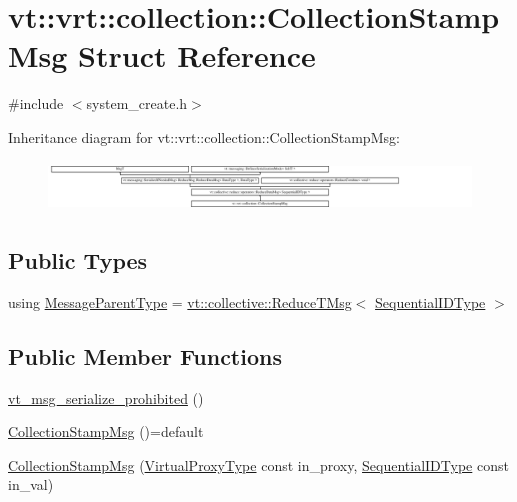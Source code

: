\hypertarget{structvt_1_1vrt_1_1collection_1_1_collection_stamp_msg}{}\section{vt\+:\+:vrt\+:\+:collection\+:\+:Collection\+Stamp\+Msg Struct Reference}
\label{structvt_1_1vrt_1_1collection_1_1_collection_stamp_msg}


{\ttfamily \#include $<$system\+\_\+create.\+h$>$}

Inheritance diagram for vt\+:\+:vrt\+:\+:collection\+:\+:Collection\+Stamp\+Msg\+:\begin{figure}[H]
\begin{center}
\leavevmode
\includegraphics[height=1.335719cm]{structvt_1_1vrt_1_1collection_1_1_collection_stamp_msg}
\end{center}
\end{figure}
\subsection*{Public Types}
\begin{DoxyCompactItemize}
\item 
using \hyperlink{structvt_1_1vrt_1_1collection_1_1_collection_stamp_msg_ac804b80a7abb715cc14b087e8714352a}{Message\+Parent\+Type} = \hyperlink{namespacevt_1_1collective_a28b82d5d48c9bc6e4fd738fcbf9e0f62}{vt\+::collective\+::\+Reduce\+T\+Msg}$<$ \hyperlink{namespacevt_a3063d4db3b879d6dd2c7b8d50995c7f6}{Sequential\+I\+D\+Type} $>$
\end{DoxyCompactItemize}
\subsection*{Public Member Functions}
\begin{DoxyCompactItemize}
\item 
\hyperlink{structvt_1_1vrt_1_1collection_1_1_collection_stamp_msg_a7718d6f0ea3e20cff67e3700149a2d38}{vt\+\_\+msg\+\_\+serialize\+\_\+prohibited} ()
\item 
\hyperlink{structvt_1_1vrt_1_1collection_1_1_collection_stamp_msg_ae285a89b90d6975acfcb20e51c6ad3d0}{Collection\+Stamp\+Msg} ()=default
\item 
\hyperlink{structvt_1_1vrt_1_1collection_1_1_collection_stamp_msg_abc2eccf793579917467c898d4ea02a72}{Collection\+Stamp\+Msg} (\hyperlink{namespacevt_a1b417dd5d684f045bb58a0ede70045ac}{Virtual\+Proxy\+Type} const in\+\_\+proxy, \hyperlink{namespacevt_a3063d4db3b879d6dd2c7b8d50995c7f6}{Sequential\+I\+D\+Type} const in\+\_\+val)
\end{DoxyCompactItemize}
